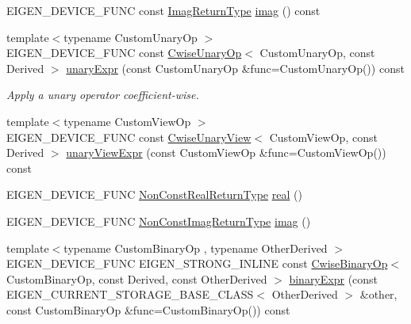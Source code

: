 \begin{DoxyCompactItemize}
\item 
E\+I\+G\+E\+N\+\_\+\+D\+E\+V\+I\+C\+E\+\_\+\+F\+U\+NC const \mbox{\hyperlink{class_eigen_1_1_cwise_unary_op}{Imag\+Return\+Type}} \mbox{\hyperlink{class_eigen_1_1_sparse_matrix_base_a1843284eb1a87e8bd37791941a751b2b}{imag}} () const
\item 
{\footnotesize template$<$typename Custom\+Unary\+Op $>$ }\\E\+I\+G\+E\+N\+\_\+\+D\+E\+V\+I\+C\+E\+\_\+\+F\+U\+NC const \mbox{\hyperlink{class_eigen_1_1_cwise_unary_op}{Cwise\+Unary\+Op}}$<$ Custom\+Unary\+Op, const Derived $>$ \mbox{\hyperlink{class_eigen_1_1_sparse_matrix_base_a1b90f8895b8d43d083119abb962c8535}{unary\+Expr}} (const Custom\+Unary\+Op \&func=Custom\+Unary\+Op()) const
\begin{DoxyCompactList}\small\item\em Apply a unary operator coefficient-\/wise. \end{DoxyCompactList}\item 
{\footnotesize template$<$typename Custom\+View\+Op $>$ }\\E\+I\+G\+E\+N\+\_\+\+D\+E\+V\+I\+C\+E\+\_\+\+F\+U\+NC const \mbox{\hyperlink{class_eigen_1_1_cwise_unary_view}{Cwise\+Unary\+View}}$<$ Custom\+View\+Op, const Derived $>$ \mbox{\hyperlink{class_eigen_1_1_sparse_matrix_base_ab7af45fec58b89cd3e5e434672557c6c}{unary\+View\+Expr}} (const Custom\+View\+Op \&func=Custom\+View\+Op()) const
\item 
E\+I\+G\+E\+N\+\_\+\+D\+E\+V\+I\+C\+E\+\_\+\+F\+U\+NC \mbox{\hyperlink{struct_eigen_1_1internal_1_1true__type}{Non\+Const\+Real\+Return\+Type}} \mbox{\hyperlink{class_eigen_1_1_sparse_matrix_base_a47a21ed23d5d10618ac0aca93903a32e}{real}} ()
\item 
E\+I\+G\+E\+N\+\_\+\+D\+E\+V\+I\+C\+E\+\_\+\+F\+U\+NC \mbox{\hyperlink{class_eigen_1_1_cwise_unary_view}{Non\+Const\+Imag\+Return\+Type}} \mbox{\hyperlink{class_eigen_1_1_sparse_matrix_base_aba4d0025dccf8a02d33b76c241e0625a}{imag}} ()
\item 
{\footnotesize template$<$typename Custom\+Binary\+Op , typename Other\+Derived $>$ }\\E\+I\+G\+E\+N\+\_\+\+D\+E\+V\+I\+C\+E\+\_\+\+F\+U\+NC E\+I\+G\+E\+N\+\_\+\+S\+T\+R\+O\+N\+G\+\_\+\+I\+N\+L\+I\+NE const \mbox{\hyperlink{class_eigen_1_1_cwise_binary_op}{Cwise\+Binary\+Op}}$<$ Custom\+Binary\+Op, const Derived, const Other\+Derived $>$ \mbox{\hyperlink{class_eigen_1_1_sparse_matrix_base_a4236dca155096386a574f9f7c6c15c61}{binary\+Expr}} (const E\+I\+G\+E\+N\+\_\+\+C\+U\+R\+R\+E\+N\+T\+\_\+\+S\+T\+O\+R\+A\+G\+E\+\_\+\+B\+A\+S\+E\+\_\+\+C\+L\+A\+SS$<$ Other\+Derived $>$ \&other, const Custom\+Binary\+Op \&func=Custom\+Binary\+Op()) const

\end{DoxyCompactItemize}
